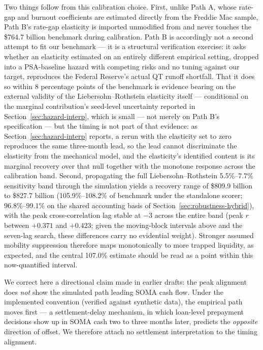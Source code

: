 \documentclass[12pt]{article}
\begin{document}
Two things follow from this calibration choice. First, unlike Path A, whose rate-gap and burnout coefficients are estimated directly from the Freddie Mac sample, Path B's rate-gap elasticity is imported unmodified from \citet{liebersohn2024} and never touches the \$764.7 billion benchmark during calibration. Path B is accordingly not a second attempt to fit our benchmark --- it is a structural verification exercise: it asks whether an elasticity estimated on an entirely different empirical setting, dropped into a PSA-baseline hazard with competing risks and no tuning against our target, reproduces the Federal Reserve's actual QT runoff shortfall. That it does so within 8 percentage points of the benchmark is evidence bearing on the external validity of the Liebersohn--Rothstein elasticity itself --- conditional on the marginal contribution's seed-level uncertainty reported in Section~\ref{sec:hazard-interp}, which is small --- not merely on Path B's specification --- but the timing is not part of that evidence: as Section~\ref{sec:hazard-interp} reports, a rerun with the elasticity set to zero reproduces the same three-month lead, so the lead cannot discriminate the elasticity from the mechanical model, and the elasticity's identified content is its marginal recovery over that null together with the monotone response across the calibration band. Second, propagating the full Liebersohn--Rothstein 5.5\%--7.7\% sensitivity band through the simulation yields a recovery range of \$809.9 billion to \$827.7 billion (105.9\%--108.2\% of benchmark under the standalone scorer; 96.8\%--99.1\% on the shared accounting basis of Section~\ref{sec:robustness-hybrid}), with the peak cross-correlation lag stable at $-3$ across the entire band (peak $r$ between $+0.371$ and $+0.423$; given the moving-block intervals above and the seven-lag search, these differences carry no evidential weight). Stronger assumed mobility suppression therefore maps monotonically to more trapped liquidity, as expected, and the central 107.0\% estimate should be read as a point within this now-quantified interval.

We correct here a directional claim made in earlier drafts: the peak alignment does \emph{not} show the simulated path leading SOMA cash flow. Under the implemented convention (verified against synthetic data), the empirical path moves first --- a settlement-delay mechanism, in which loan-level prepayment decisions show up in SOMA cash two to three months later, predicts the \emph{opposite} direction of offset. We therefore attach no settlement interpretation to the timing alignment.
\end{document}
